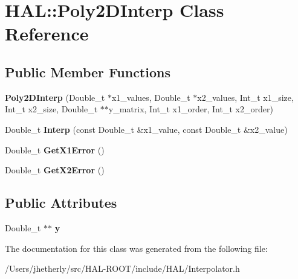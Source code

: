 \hypertarget{class_h_a_l_1_1_poly2_d_interp}{\section{H\+A\+L\+:\+:Poly2\+D\+Interp Class Reference}
\label{class_h_a_l_1_1_poly2_d_interp}
}
\subsection*{Public Member Functions}
\begin{DoxyCompactItemize}
\item 
\hypertarget{class_h_a_l_1_1_poly2_d_interp_a2e06fafe80eb98739813a67a1f5b5f89}{{\bfseries Poly2\+D\+Interp} (Double\+\_\+t $\ast$x1\+\_\+values, Double\+\_\+t $\ast$x2\+\_\+values, Int\+\_\+t x1\+\_\+size, Int\+\_\+t x2\+\_\+size, Double\+\_\+t $\ast$$\ast$y\+\_\+matrix, Int\+\_\+t x1\+\_\+order, Int\+\_\+t x2\+\_\+order)}\label{class_h_a_l_1_1_poly2_d_interp_a2e06fafe80eb98739813a67a1f5b5f89}

\item 
\hypertarget{class_h_a_l_1_1_poly2_d_interp_aaeda2c3c4e09d48611973dcd95940756}{Double\+\_\+t {\bfseries Interp} (const Double\+\_\+t \&x1\+\_\+value, const Double\+\_\+t \&x2\+\_\+value)}\label{class_h_a_l_1_1_poly2_d_interp_aaeda2c3c4e09d48611973dcd95940756}

\item 
\hypertarget{class_h_a_l_1_1_poly2_d_interp_a3488ef8691d670a5f2170a9ebead44d7}{Double\+\_\+t {\bfseries Get\+X1\+Error} ()}\label{class_h_a_l_1_1_poly2_d_interp_a3488ef8691d670a5f2170a9ebead44d7}

\item 
\hypertarget{class_h_a_l_1_1_poly2_d_interp_a9d7ab5e66ee29fe41187d39086152dfe}{Double\+\_\+t {\bfseries Get\+X2\+Error} ()}\label{class_h_a_l_1_1_poly2_d_interp_a9d7ab5e66ee29fe41187d39086152dfe}

\end{DoxyCompactItemize}
\subsection*{Public Attributes}
\begin{DoxyCompactItemize}
\item 
\hypertarget{class_h_a_l_1_1_poly2_d_interp_af07844f91abbfa62348292ae16a90fdc}{Double\+\_\+t $\ast$$\ast$ {\bfseries y}}\label{class_h_a_l_1_1_poly2_d_interp_af07844f91abbfa62348292ae16a90fdc}

\end{DoxyCompactItemize}


The documentation for this class was generated from the following file\+:\begin{DoxyCompactItemize}
\item 
/\+Users/jhetherly/src/\+H\+A\+L-\/\+R\+O\+O\+T/include/\+H\+A\+L/Interpolator.\+h\end{DoxyCompactItemize}
